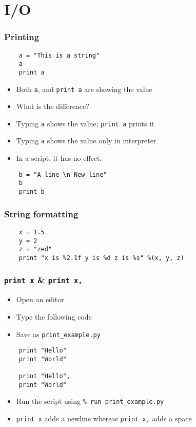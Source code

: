 \section{I/O}

\begin{frame}[fragile]
  \frametitle{Printing}
  \begin{lstlisting}
    a = "This is a string"
    a
    print a
  \end{lstlisting}
  \begin{itemize}
  \item Both \texttt{a}, and \texttt{print a} are showing the value
  \item What is the difference?
  \item Typing \texttt{a} shows the value; \texttt{print a} prints it
  \item Typing \texttt{a} shows the value only in interpreter
  \item In a script, it has no effect. 
  \end{itemize}
  \begin{lstlisting}
    b = "A line \n New line"
    b
    print b
  \end{lstlisting}
\end{frame}

\begin{frame}[fragile]
  \frametitle{String formatting}
  \begin{lstlisting}
    x = 1.5
    y = 2
    z = "zed"
    print "x is %2.1f y is %d z is %s" %(x, y, z)
  \end{lstlisting}
\end{frame}

\begin{frame}[fragile]
  \frametitle{\texttt{print x} \& \texttt{print x,}}
  \begin{itemize}
  \item Open an editor
  \item Type the following code
  \item Save as \texttt{print\_example.py}
  \end{itemize}
  \begin{lstlisting}
    print "Hello"
    print "World"

    print "Hello",
    print "World"
  \end{lstlisting}
  \begin{itemize}
  \item Run the script using \texttt{\% run print\_example.py}
  \item \texttt{print x} adds a newline whereas \texttt{print x,} adds
    a space
  \end{itemize}
\end{frame}

